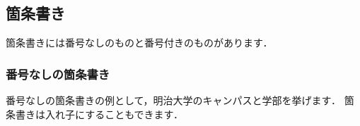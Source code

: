 \documentclass[
    paper=a4paper,      %
    article,            %
    fontsize=11pt,      %
    jafontsize=11pt,    %
    head_space=25mm,    %
    foot_space=25mm,    %
    gutter=20mm,        %
    fore-edge=20mm      %
    ]{jlreq}            %
\begin{document}
\clearpage

\subsection{箇条書き}
\label{ssec:list}

箇条書きには番号なしのものと番号付きのものがあります．

\subsubsection{番号なしの箇条書き}
\label{sssec:itemize}

番号なしの箇条書きの例として，明治大学のキャンパスと学部を挙げます．
箇条書きは入れ子にすることもできます．

\vspace{-3mm}
\end{document}
